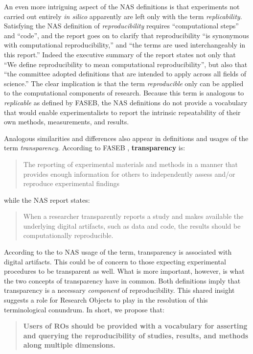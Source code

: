 An even more intriguing aspect of the NAS definitions \cite{committeeonreproducibilityandreplicabilityinscience2019reproducibility} 
	is that experiments not carried out 
	entirely \emph{in silico} apparently are left only with the term \emph{replicability}.  
Satisfying the NAS definition of \emph{reproducibility} requires 
	``computational steps'' and ``code'', and the report goes on to clarify
	that reproducibility ``is synonymous with computational reproducibility,''  and ``the terms are used interchangeably in this report.''
Indeed the executive summary of the report states not only that ``We define reproducibility to mean computational reproducibility'',
	but also that ``the committee adopted definitions that are intended to apply across all fields of science.''
The clear implication is that the term \emph{reproducible} only can be applied to the computational components of research.
Because this term is analogous to \emph{replicable} as defined by FASEB, the NAS definitions do not provide a vocabulary 
	that would enable experimentalists to report the intrinsic repeatability of their own methods, measurements, and results. 

Analogous similarities and differences also appear in definitions and usages of the term \emph{transparency}. 
According to FASEB \cite{FASEB2016enhancing}, \textbf{transparency} is: 
\begin{quote}
	The reporting of experimental materials and methods in a manner that provides enough information 
	for others to independently assess and/or reproduce experimental findings
      \end{quote}
while the NAS report \cite{committeeonreproducibilityandreplicabilityinscience2019reproducibility} states:
 \begin{quote}
	When a researcher transparently reports a study and makes available the underlying digital artifacts, such as data and code, 
	the results should be computationally reproducible.
      \end{quote}
 
\noindent According to the to NAS usage of the term, transparency is associated with digital artifacts.  
This could be of concern to those expecting experimental procedures to be transparent as well.
What is more important, however, is what the two concepts of transparency have in common.
Both definitions imply that transparency is a necessary \emph{component} of reproducibility.
This shared insight suggests a role for Research Objects to play in the resolution of this terminological conundrum.
In short, we propose that:
        \begin{quote}
        \bf Users of ROs should be provided with a vocabulary for asserting and querying the reproducibility
          of studies, results, and methods along multiple dimensions.
      \end{quote}

